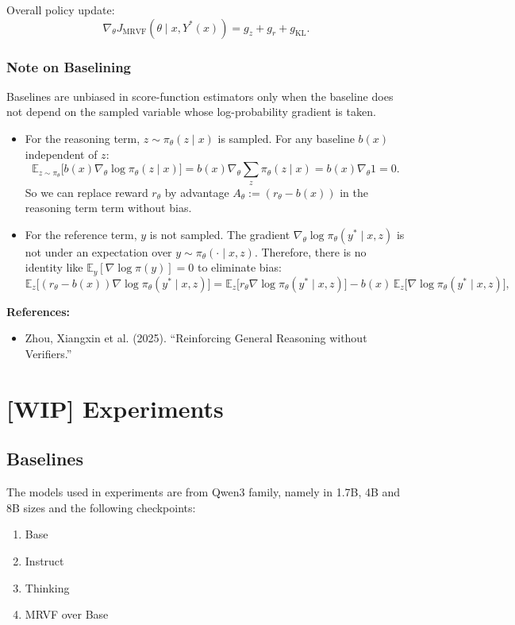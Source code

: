 \documentclass[12pt]{extarticle}
\begin{document}
Overall policy update:
\[
  \nabla_{\theta} J_{\text{MRVF}}(\theta\mid x,Y^{*}(x)) = g_z + g_{r} + g_{\text{KL}}.
\]

\subsubsection{Note on Baselining}
Baselines are unbiased in score-function estimators only when the baseline does not depend on the sampled variable whose log-probability gradient is taken.

\begin{itemize}[leftmargin=1.5em]
  \item For the reasoning term, \(z\sim\pi_\theta(z\mid x)\) is sampled. For any baseline \(b(x)\) independent of \(z\):
        \[
          \mathbb{E}_{z\sim\pi_\theta}\big[b(x)\nabla_\theta\log\pi_\theta(z\mid x)\big]
          = b(x)\nabla_\theta\sum_z \pi_\theta(z\mid x)=b(x)\nabla_\theta 1=0.
        \]
        So we can replace reward \(r_\theta\) by advantage \(A_\theta:=(r_\theta-b(x))\) in the reasoning term term without bias.

  \item For the reference term, \(y\) is not sampled. The gradient \(\nabla_\theta\log\pi_\theta(y^{*}\mid x,z)\) is not under an expectation over \(y\sim \pi_\theta(\cdot\mid x,z)\). Therefore, there is no identity like \(\mathbb{E}_{y}[\nabla\log\pi(y)]=0\) to eliminate bias:
        \[
          \mathbb{E}_z\big[(r_\theta-b(x))\nabla\log\pi_\theta(y^{*}\mid x,z)\big]
          = \mathbb{E}_z\big[r_\theta\nabla\log\pi_\theta(y^{*}\mid x,z)\big] - b(x)\,\mathbb{E}_z\big[\nabla\log\pi_\theta(y^{*}\mid x,z)\big],
        \]
\end{itemize}

\textbf{References:}
\begin{itemize}[leftmargin=1.5em]
  \item Zhou, Xiangxin et al. (2025). ``Reinforcing General Reasoning without Verifiers.''
\end{itemize}

\section{[WIP] Experiments}

\subsection{Baselines}

The models used in experiments are from Qwen3 family, namely in 1.7B, 4B and 8B sizes and the following checkpoints:
\begin{enumerate}[leftmargin=1.8em]
  \item Base
  \item Instruct
  \item Thinking
  \item MRVF over Base
\end{enumerate}
\end{document}
